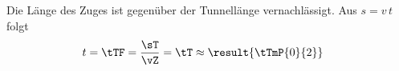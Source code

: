 Die Länge des Zuges ist gegenüber der Tunnellänge vernachlässigt. Aus $s = v\,t$ folgt
\begin{align}
 t &= \tTF = \frac{\sT}{\vZ} = \tT \approx \result{\tTmP{0}{2}}
\end{align}
